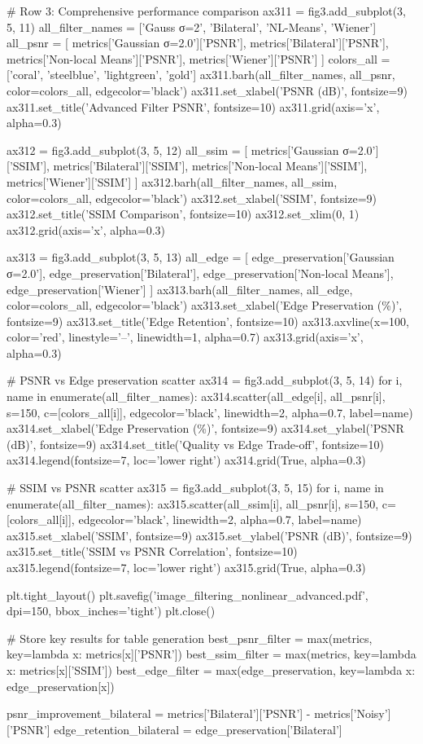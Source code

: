 \documentclass[a4paper, 11pt]{article}
\begin{document}
\begin{pycode}
# Row 3: Comprehensive performance comparison
ax311 = fig3.add_subplot(3, 5, 11)
all_filter_names = ['Gauss σ=2', 'Bilateral', 'NL-Means', 'Wiener']
all_psnr = [
    metrics['Gaussian σ=2.0']['PSNR'],
    metrics['Bilateral']['PSNR'],
    metrics['Non-local Means']['PSNR'],
    metrics['Wiener']['PSNR']
]
colors_all = ['coral', 'steelblue', 'lightgreen', 'gold']
ax311.barh(all_filter_names, all_psnr, color=colors_all, edgecolor='black')
ax311.set_xlabel('PSNR (dB)', fontsize=9)
ax311.set_title('Advanced Filter PSNR', fontsize=10)
ax311.grid(axis='x', alpha=0.3)

ax312 = fig3.add_subplot(3, 5, 12)
all_ssim = [
    metrics['Gaussian σ=2.0']['SSIM'],
    metrics['Bilateral']['SSIM'],
    metrics['Non-local Means']['SSIM'],
    metrics['Wiener']['SSIM']
]
ax312.barh(all_filter_names, all_ssim, color=colors_all, edgecolor='black')
ax312.set_xlabel('SSIM', fontsize=9)
ax312.set_title('SSIM Comparison', fontsize=10)
ax312.set_xlim(0, 1)
ax312.grid(axis='x', alpha=0.3)

ax313 = fig3.add_subplot(3, 5, 13)
all_edge = [
    edge_preservation['Gaussian σ=2.0'],
    edge_preservation['Bilateral'],
    edge_preservation['Non-local Means'],
    edge_preservation['Wiener']
]
ax313.barh(all_filter_names, all_edge, color=colors_all, edgecolor='black')
ax313.set_xlabel('Edge Preservation (\%)', fontsize=9)
ax313.set_title('Edge Retention', fontsize=10)
ax313.axvline(x=100, color='red', linestyle='--', linewidth=1, alpha=0.7)
ax313.grid(axis='x', alpha=0.3)

# PSNR vs Edge preservation scatter
ax314 = fig3.add_subplot(3, 5, 14)
for i, name in enumerate(all_filter_names):
    ax314.scatter(all_edge[i], all_psnr[i], s=150, c=[colors_all[i]],
                 edgecolor='black', linewidth=2, alpha=0.7, label=name)
ax314.set_xlabel('Edge Preservation (\%)', fontsize=9)
ax314.set_ylabel('PSNR (dB)', fontsize=9)
ax314.set_title('Quality vs Edge Trade-off', fontsize=10)
ax314.legend(fontsize=7, loc='lower right')
ax314.grid(True, alpha=0.3)

# SSIM vs PSNR scatter
ax315 = fig3.add_subplot(3, 5, 15)
for i, name in enumerate(all_filter_names):
    ax315.scatter(all_ssim[i], all_psnr[i], s=150, c=[colors_all[i]],
                 edgecolor='black', linewidth=2, alpha=0.7, label=name)
ax315.set_xlabel('SSIM', fontsize=9)
ax315.set_ylabel('PSNR (dB)', fontsize=9)
ax315.set_title('SSIM vs PSNR Correlation', fontsize=10)
ax315.legend(fontsize=7, loc='lower right')
ax315.grid(True, alpha=0.3)

plt.tight_layout()
plt.savefig('image_filtering_nonlinear_advanced.pdf', dpi=150, bbox_inches='tight')
plt.close()

# Store key results for table generation
best_psnr_filter = max(metrics, key=lambda x: metrics[x]['PSNR'])
best_ssim_filter = max(metrics, key=lambda x: metrics[x]['SSIM'])
best_edge_filter = max(edge_preservation, key=lambda x: edge_preservation[x])

psnr_improvement_bilateral = metrics['Bilateral']['PSNR'] - metrics['Noisy']['PSNR']
edge_retention_bilateral = edge_preservation['Bilateral']
\end{pycode}
\end{document}
